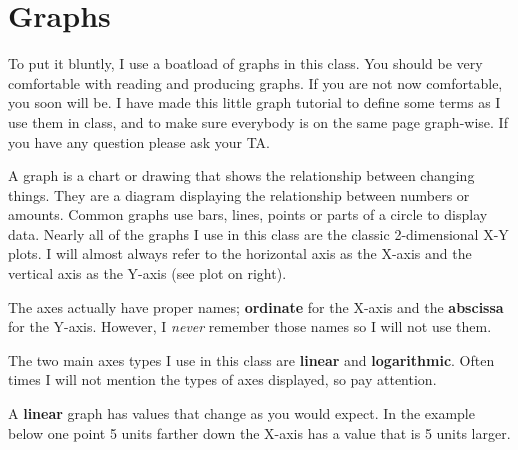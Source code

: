 

\setcounter{page}{1}
\setlength{\parindent}{0ex}
\setlength{\baselineskip}{15pt}
\setlength{\parskip}{0.9ex}


\small

\section*{Graphs}

To put it bluntly, I use a boatload of graphs in this class.  You
should be very comfortable with reading and producing graphs.  If you
are not now comfortable, you soon will be.  I have made this little
graph tutorial to define some terms as I use them in class, and to
make sure everybody is on the same page graph-wise.  If you have any
question please ask your TA.

\vskip 3mm

\parbox{9.5cm}{ 
A graph is a chart or drawing that shows the relationship between
changing things.  They are a diagram displaying the relationship
between numbers or amounts. Common graphs use bars, lines, points or
parts of a circle to display data.  Nearly all of the graphs I use in
this class are the classic 2-dimensional X-Y plots.  I will almost
always refer to the horizontal axis as the X-axis and the vertical
axis as the Y-axis (see plot on right).}
\makebox[0.5cm]{}

\vskip 3mm

The axes actually have proper names; {\bf ordinate} for the X-axis and
the {\bf abscissa} for the Y-axis.  However, I {\it never} remember
those names so I will not use them.


The two main axes types I use in this class are {\bf linear} and {\bf
  logarithmic}.  Often times I will not mention the types of axes
  displayed, so pay attention.  

A {\bf linear} graph has values that change as you would expect.  In
the example below one point 5 units farther down the X-axis has a value
that is 5 units larger.

